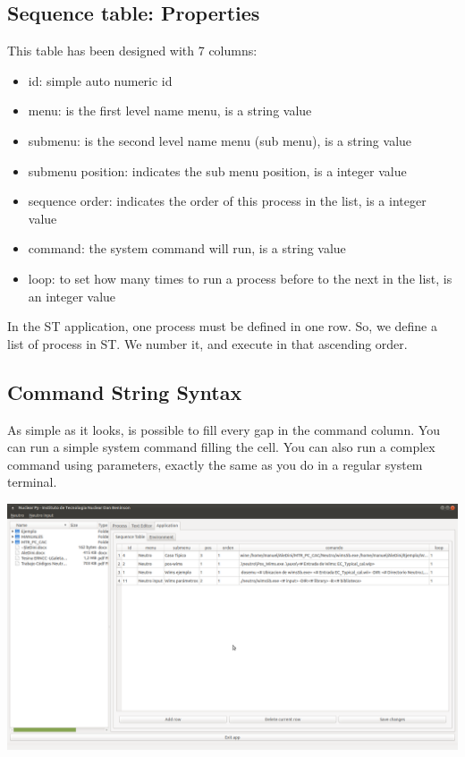 \documentclass[a4paper,10pt]{article}
\begin{document}
\subsection{Sequence table: Properties}
This table has been designed with 7 columns:

\begin{itemize}
    \item id: simple auto numeric id
    \item menu: is the first level name menu, is a string value
    \item submenu: is the second level name menu (sub menu), is a string value
    \item submenu position: indicates the sub menu position, is a integer value
    \item sequence order: indicates the order of this process in the list, is a integer value
    \item command: the system command will run, is a string value
    \item loop: to set how many times to run a process before to the next in the list, is an integer value
\end{itemize}

In the ST application, one process must be defined in one row. So, we define a list of process in ST. We number it, and execute in that ascending order.

\subsection{Command String Syntax}

As simple as it looks, is possible to fill every gap in the command column. You can run a simple system command filling the cell. You can also run a complex command using parameters, exactly the same as you do in a regular system terminal.

\begin{center}
 \includegraphics[width=\textwidth]{img/sequenceTable.png}
\end{center}
\end{document}
